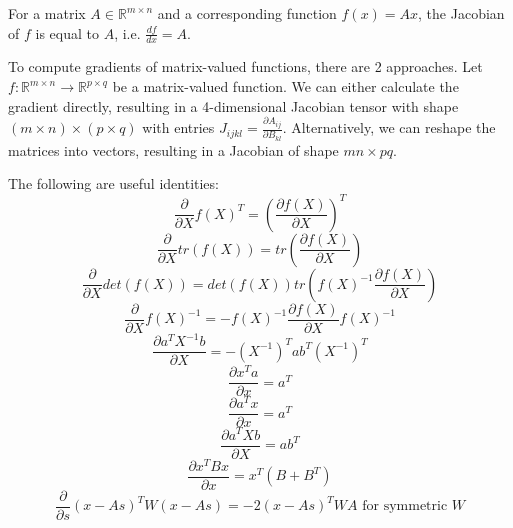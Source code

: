 For a matrix $A \in \mathbb{R}^{m \times n}$ and a corresponding function $f(x) = Ax$,
the Jacobian of $f$ is equal to $A$,
i.e. $\frac{d f}{d x} = A$.

To compute gradients of matrix-valued functions, there are 2 approaches.
Let $f : \mathbb{R}^{m \times n} \to \mathbb{R}^{p \times q}$ be a matrix-valued function.
We can either calculate the gradient directly, resulting in a 4-dimensional Jacobian tensor
with shape $(m \times n) \times (p \times q)$ with entries
$J_{ijkl} = \frac{\partial A_{ij}}{\partial B_{kl}}$.
Alternatively, we can reshape the matrices into vectors,
resulting in a Jacobian of shape $mn \times pq$.

The following are useful identities:
\begin{equation*}
    \frac{\partial}{\partial X} f(X)^T = \left( \frac{\partial f(X)}{\partial X} \right)^T
\end{equation*}
\begin{equation*}
    \frac{\partial}{\partial X} tr(f(X)) = tr\left( \frac{\partial f(X)}{\partial X} \right)
\end{equation*}
\begin{equation*}
    \frac{\partial}{\partial X} det(f(X)) = det(f(X)) tr\left( f(X)^{-1} \frac{\partial f(X)}{\partial X} \right)
\end{equation*}
\begin{equation*}
    \frac{\partial}{\partial X} f(X)^{-1} = -f(X)^{-1} \frac{\partial f(X)}{\partial X} f(X)^{-1} 
\end{equation*}
\begin{equation*}
    \frac{\partial a^T X^{-1} b}{\partial X}
    = -(X^{-1})^T ab^T (X^{-1})^T
\end{equation*}
\begin{equation*}
    \frac{\partial x^T a}{\partial x} = a^T
\end{equation*}
\begin{equation*}
    \frac{\partial a^T x}{\partial x} = a^T
\end{equation*}
\begin{equation*}
    \frac{\partial a^T X b}{\partial X} = ab^T
\end{equation*}
\begin{equation*}
    \frac{\partial x^T B x}{\partial x} = x^T (B + B^T)
\end{equation*}
\begin{equation*}
    \frac{\partial}{\partial s} (x - As)^T W (x - As)
    = -2 (x - As)^T W A \text{ for symmetric $W$}
\end{equation*}

